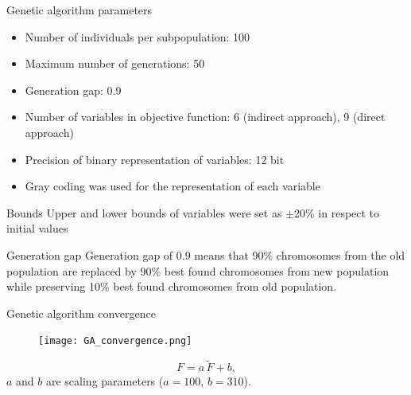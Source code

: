 \documentclass[10pt]{beamer} %
\begin{document}
\begin{frame}[t,label=frame24]{Genetic algorithm parameters}
\begin{itemize}
	\item Number of individuals per subpopulation: 100
	\item Maximum number of generations: 50
	\item Generation gap: 0.9
	\item Number of variables in objective function: 6 (indirect approach), 9 (direct approach)
	\item Precision of binary representation of variables: 12 bit
	\item Gray coding was used for the representation of each variable
\end{itemize}
\vspace{6pt}
\begin{alertblock}{Bounds}
	Upper and lower bounds of variables were set as  $\pm$20\% in respect to initial values
\end{alertblock}
\begin{block}{Generation gap}
	 Generation gap of 0.9 means that 90\% chromosomes from the old population are replaced by 90\% best found chromosomes from new population while preserving 10\% best found chromosomes from old population.
\end{block}
\end{frame}
\begin{frame}[c,label=frame25]{Genetic algorithm convergence}
	\begin{figure} [h!]
	\centering
	\texttt{[image: GA\_convergence.png]}
	\label{fig:GAconvergence}
\end{figure}
\begin{equation*}
F = a \,  \tilde{F} + b,
\end{equation*}
$a$ and $b$ are scaling parameters ($a=100$, $b=310$).
\end{frame}
\end{document}

